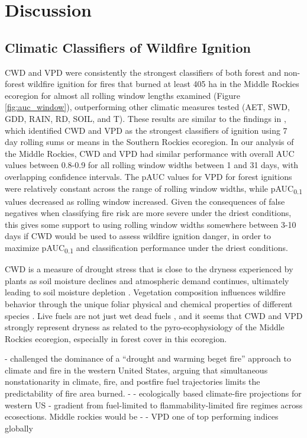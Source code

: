 \documentclass[11p]{article}
\newcommand{\pauc}[1]{pAUC\textsubscript{#1}}
\begin{document}
\section{Discussion}

\subsection{Climatic Classifiers of Wildfire Ignition}
CWD and VPD were consistently the strongest classifiers of both forest and non-forest wildfire ignition for fires that burned at least 405 ha in the Middle Rockies ecoregion for almost all rolling window lengths examined (Figure \ref{fig:auc_window}), outperforming other climatic measures tested (AET, SWD, GDD, RAIN, RD, SOIL, and T).  These results are similar to the findings in , which identified CWD and VPD as the strongest classifiers of ignition using 7 day rolling sums or means in the Southern Rockies ecoregion.  In our analysis of the Middle Rockies, CWD and VPD had similar performance with overall AUC values between 0.8-0.9 for all rolling window widths between 1 and 31 days, with overlapping confidence intervals. The pAUC values for VPD for forest ignitions were relatively constant across the range of rolling window widths, while \pauc{0.1} values decreased as rolling window increased.  Given the consequences of false negatives when classifying fire risk are more severe under the driest conditions, this gives some support to using rolling window widths somewhere between 3-10 days if CWD would be used to assess wildfire ignition danger, in order to maximize \pauc{0.1} and classification performance under the driest conditions.

CWD is a measure of drought stress that is close to the dryness experienced by plants as soil moisture declines and atmospheric demand continues, ultimately leading to soil moisture depletion \citep{stephensonActualEvapotranspirationDeficit1998}. Vegetation composition influences wildfire behavior through the unique foliar physical and chemical properties of different species \citep{mattjollySeasonalVariationsRed2016}. Live fuels are not just wet dead fuels \citep{jollyPyroEcophysiologyShiftingParadigm2018}, and it seems that CWD and VPD strongly represent dryness as related to the pyro-ecophysiology of the Middle Rockies ecoregion, especially in forest cover in this ecoregion.

- \citet{littellClimateChangeFuture2018} challenged the dominance of a “drought and warming beget fire” approach to climate and fire in the western United States, arguing that simultaneous nonstationarity in climate, fire, and postfire fuel trajectories limits the predictability of fire area burned.
- \citet{littellClimateChangeFuture2018} - ecologically based climate-fire projections for western US - gradient from fuel-limited to flammability-limited fire regimes across ecosections.  Middle rockies would be
- \citet{zacharakisEnvironmentalForestFire2023} - VPD one of top performing indices globally
\end{document}
